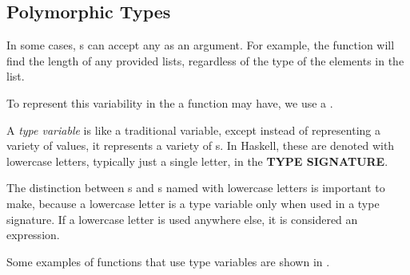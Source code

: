 \subsection{Polymorphic Types}\label{subsec:Polymorphic_Types}
In some cases, s can accept any  as an argument.
For example, the  function will find the length of any provided lists, regardless of the type of the elements in the list.

To represent this variability in the  a function may have, we use a .

\begin{definition}\label{def:Type_Variable}
  A \emph{type variable} is like a traditional variable, except instead of representing a variety of values, it represents a variety of s.
  In Haskell, these are denoted with lowercase letters, typically just a single letter, in the \textbf{TYPE SIGNATURE}.
  \begin{remark}
    The distinction between s and s named with lowercase letters is important to make, because a lowercase letter is a type variable only when used in a type signature.
    If a lowercase letter is used anywhere else, it is considered an expression.
  \end{remark}

  Some examples of functions that use type variables are shown in .
\end{definition}

